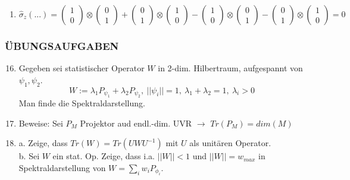 \documentclass[twoside,a4paper]{scrartcl}
\renewcommand{\1}{\mathds{1}}
\newcommand{\ra}{\rightarrow}
\renewcommand{\l}{\lambda}
\begin{document}
{\begin{enumerate}
\item $$\hat \sigma_z(...)=\begin{pmatrix} 1 \\0 \end{pmatrix} \otimes \begin{pmatrix} 0 \\1 \end{pmatrix}+\begin{pmatrix} 0 \\1 \end{pmatrix}\otimes \begin{pmatrix} 1 \\0 \end{pmatrix}-\begin{pmatrix} 1 \\0 \end{pmatrix} \otimes \begin{pmatrix} 0 \\1 \end{pmatrix}-\begin{pmatrix} 0 \\1 \end{pmatrix}\otimes \begin{pmatrix} 1 \\0 \end{pmatrix}=0$$
\end{enumerate}
}{}

\subsubsection*{ÜBUNGSAUFGABEN}
\begin{enumerate}
\setcounter{enumi}{15}
\item Gegeben sei statistischer Operator $W$ in 2-dim. Hilbertraum, aufgespannt von $\psi_1, \psi_2$.\\
$$W:= \l_1P_{\psi_1}+\l_2 P_{\psi_2}, \ ||\psi_i||=1, \ \l_1+ \l_2=1, \ \l_i>0$$
Man finde die Spektraldarstellung.
\item Beweise: Sei $P_M$ Projektor aud endl.-dim. UVR $\ra$ $Tr(P_M)=dim(M)$
\item a. Zeige, dass $Tr(W)=Tr(UWU^{-1})$ mit $U$ als unitären Operator.\\
b. Sei $W$ ein stat. Op. Zeige, dass i.a. $||W||<1$ und $||W||=w_{max}$ in Spektraldarstellung von $W=\sum_i w_i P_{\phi_i}$.
\end{enumerate}
\end{document}
